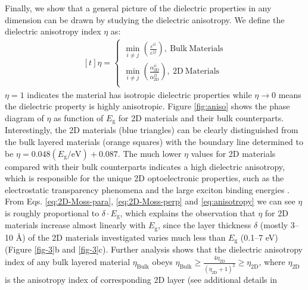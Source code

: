 \documentclass[journal=ancac3,manuscript=article,email=true,hyperref=true,keywords=false]{achemso}
\begin{document}
Finally, we show that a general picture of the dielectric properties in
any dimension can be drawn by studying the dielectric
anisotropy. We define the dielectric anisotropy index $\eta$ as:
\begin{equation}
  \label{eq:anisotropy}
  \begin{aligned}[t]
    \eta =
    \begin{cases}
      {\displaystyle \min_{i \neq j}}
      {\displaystyle
        \left(\frac{\varepsilon^{ii}}{\varepsilon^{jj}}\right)},
      \ \mathrm{Bulk\ Materials}\\
      {\displaystyle \min_{i \neq j}}
      {\displaystyle
        \left(\frac{\alpha_{\mathrm{2D}}^{ii}}{\alpha_{\mathrm{2D}}^{jj}}\right)},
      \ \mathrm{2D\ Materials}\\
    \end{cases}
  \end{aligned}
\end{equation}
$\eta=1$ indicates the material has isotropic dielectric properties
while $\eta \to 0$ means the dielectric property is highly
anisotropic. Figure \ref{fig:aniso} shows the phase diagram of $\eta$
as function of $E_{\mathrm{g}}$ for 2D materials and their bulk
counterparts. Interestingly, the 2D materials (blue triangles) can be
clearly distinguished from the bulk layered materials (orange squares)
with the boundary line determined to be
$\eta =0.048 (E_{\mathrm{g}}/ \mathrm{eV})+0.087$. The much lower
$\eta$ values for 2D materials compared with their bulk counterparts
indicates a high dielectric anisotropy, which is responsible for the
unique 2D optoelectronic properties, such as the electrostatic
transparency phenomena\cite{Liluhua_2014,Tian_2016,Li_2018} and the large exciton
binding energies
\cite{Pulci_2014,Tran_2014,Chernikov_2014_EB_MoS2_2D3D,Berkelbach_2013}. From
Eqs. \ref{eq:2D-Moss-para}, \ref{eq:2D-Moss-perp} and
\ref{eq:anisotropy} we can see $\eta$ is roughly proportional to
$\delta \cdot E_{\mathrm{g}}$, which explains the observation that
$\eta$ for 2D materials increase almost linearly with
$E_{\mathrm{g}}$, since the layer thickness $\delta$ (mostly 3--10
\AA{}) of the 2D materials investigated varies much less than
$E_{\mathrm{g}}$ (0.1--7 eV) (Figure \ref{fig-3}b and
\ref{fig-3}c). Further analysis shows that the dielectric anisotropy
index of any bulk layered material $\eta_{\mathrm{Bulk}}$ obeys
$\eta_{\mathrm{Bulk}} \geq {\displaystyle \frac{4
    \eta_{\mathrm{2D}}}{(\eta_{\mathrm{2D}}+1)^{2}}} \geq
\eta_{\mathrm{2D}}$, where $\eta_{\mathrm{2D}}$ is the anisotropy
index of corresponding 2D layer (see additional details in
\end{document}
